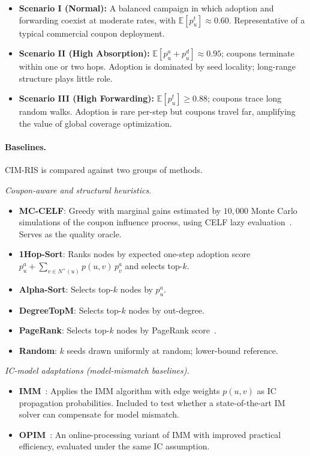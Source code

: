 \documentclass[sigconf]{acmart}
\newcommand{\CIMRIS}{\textsc{CIM-RIS}}
\newcommand{\E}{\mathbb{E}}
\begin{document}
\begin{itemize}[leftmargin=*]
  \item \textbf{Scenario I (Normal):}
    A balanced campaign in which adoption and forwarding coexist at
    moderate rates, with $\E[p_u^t] \approx 0.60$.
    Representative of a typical commercial coupon deployment.
  \item \textbf{Scenario II (High Absorption):}
    $\E[p_u^a + p_u^d] \approx 0.95$; coupons terminate within
    one or two hops.
    Adoption is dominated by seed locality; long-range structure
    plays little role.
  \item \textbf{Scenario III (High Forwarding):}
    $\E[p_u^t] \geq 0.88$; coupons trace long random walks.
    Adoption is rare per-step but coupons travel far, amplifying
    the value of global coverage optimization.
\end{itemize}

\paragraph{Baselines.}
\CIMRIS{} is compared against two groups of methods.

\smallskip\noindent\textit{Coupon-aware and structural heuristics.}
\begin{itemize}[leftmargin=*]
  \item \textbf{MC-CELF}: Greedy with marginal gains estimated by
    $10{,}000$ Monte Carlo simulations of the coupon influence process,
    using CELF lazy evaluation~\cite{leskovec2007celf}.
    Serves as the quality oracle.
  \item \textbf{1Hop-Sort}: Ranks nodes by expected one-step adoption
    score $p_u^a + \sum_{v \in N^+(u)} p(u,v)\,p_v^a$ and selects
    top-$k$.
  \item \textbf{Alpha-Sort}: Selects top-$k$ nodes by $p_u^a$.
  \item \textbf{DegreeTopM}: Selects top-$k$ nodes by out-degree.
  \item \textbf{PageRank}: Selects top-$k$ nodes by PageRank
    score~\cite{page1999pagerank}.
  \item \textbf{Random}: $k$ seeds drawn uniformly at random;
    lower-bound reference.
\end{itemize}

\smallskip\noindent\textit{IC-model adaptations (model-mismatch baselines).}
\begin{itemize}[leftmargin=*]
  \item \textbf{IMM}~\cite{tang2015influence}: Applies the IMM
    algorithm with edge weights $p(u,v)$ as IC propagation
    probabilities.  Included to test whether a state-of-the-art IM
    solver can compensate for model mismatch.
  \item \textbf{OPIM}~\cite{tang2018online}: An online-processing
    variant of IMM with improved practical efficiency, evaluated under
    the same IC assumption.
\end{itemize}
\end{document}
